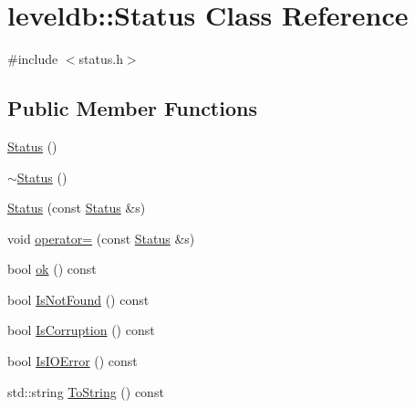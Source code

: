 \hypertarget{classleveldb_1_1_status}{}\section{leveldb\+:\+:Status Class Reference}
\label{classleveldb_1_1_status}


{\ttfamily \#include $<$status.\+h$>$}

\subsection*{Public Member Functions}
\begin{DoxyCompactItemize}
\item 
\hyperlink{classleveldb_1_1_status_a941ec793179e81df3032a612cfe5039f}{Status} ()
\item 
\hyperlink{classleveldb_1_1_status_a5f36252202fb791ef8312fe848ffceb3}{$\sim$\+Status} ()
\item 
\hyperlink{classleveldb_1_1_status_a4fef11f480cb940d06c43e600076be13}{Status} (const \hyperlink{classleveldb_1_1_status}{Status} \&s)
\item 
void \hyperlink{classleveldb_1_1_status_a26a147ba1b39730335f5de14285b2c6a}{operator=} (const \hyperlink{classleveldb_1_1_status}{Status} \&s)
\item 
bool \hyperlink{classleveldb_1_1_status_ab31e89a858c766716e3dc952be857c65}{ok} () const 
\item 
bool \hyperlink{classleveldb_1_1_status_ad5462f26196fc04d72221d2fdf1872ca}{Is\+Not\+Found} () const 
\item 
bool \hyperlink{classleveldb_1_1_status_a0e07d12ab4f8d2a3e0b3c1bf435a77db}{Is\+Corruption} () const 
\item 
bool \hyperlink{classleveldb_1_1_status_af200f3aa95b7e455397baabf513673ec}{Is\+I\+O\+Error} () const 
\item 
std\+::string \hyperlink{classleveldb_1_1_status_aa8b56d8fe2cd1873778de5d1e5407866}{To\+String} () const 
\end{DoxyCompactItemize}
